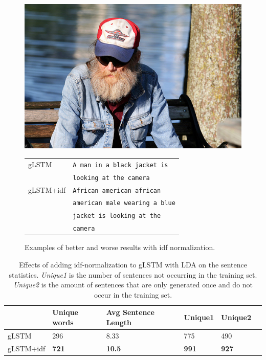 \documentclass[twoside,twocolumn]{article}
\begin{document}
\begin{figure}
\begin{minipage}[t]{.7\textwidth}
		\end{minipage}
		\centering
		\begin{minipage}[t]{.45\textwidth}
			\centering
			\vspace{0pt}
			\includegraphics[width=\textwidth]{Images/441817653}
		\end{minipage}\hfill
		\begin{minipage}[t]{.7\textwidth}
			\vspace{0pt}
			\begin{tabular}{ll}
				gLSTM & \texttt{A man in a black jacket is} \\ 
				~ & \texttt{looking at the camera} \\
				gLSTM+idf & \texttt{African american african}\\
				~ & \texttt{american male wearing a blue} \\
				~ & \texttt{jacket is looking at the} \\
				~ & \texttt{camera} \\
			\end{tabular}
		\end{minipage}
		\caption{Examples of better and worse results with idf normalization.}
		\label{fig:idf}
	\end{figure}
	
	\begin{table}
		\centering
		\begin{tabular}{llllll}
			~                   & Unique words& Avg Sentence Length & Unique1 & Unique2 \\ \hline
			gLSTM                         & 296   & 8.33   & 775   & 490  \\
			
			gLSTM+idf                 & \textbf{721}   & \textbf{10.5}   & \textbf{991}   & \textbf{927}    \\\hline
		\end{tabular}
		\caption{Effects of adding idf-normalization to gLSTM with LDA on the sentence statistics. \emph{Unique1} is the number of sentences not occurring in the training set. \emph{Unique2} is the amount of sentences that are only generated once and do not occur in the training set.}
		\label{table:idf-stats}
	\end{table}
	
\end{document}
